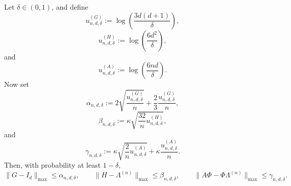 \begin{corollary}
	\label{cor:results-simultaneous-control}
	Let \(\delta\in(0,1)\), and define
	\begin{equation}
		u_{n,d,\delta}^{(G)}
		:=
		\log\!\left(\frac{3d(d+1)}{\delta}\right),
		\label{eq:results-uG}
	\end{equation}
	\begin{equation}
		u_{n,d,\delta}^{(H)}
		:=
		\log\!\left(\frac{6d^2}{\delta}\right),
		\label{eq:results-uH}
	\end{equation}
	and
	\begin{equation}
		u_{n,d,\delta}^{(A)}
		:=
		\log\!\left(\frac{6nd}{\delta}\right).
		\label{eq:results-uA}
	\end{equation}
	Now set
	\begin{equation}
		\alpha_{n,d,\delta}
		:=
		2\sqrt{\frac{u_{n,d,\delta}^{(G)}}{n}}
		+\frac{2}{3}\frac{u_{n,d,\delta}^{(G)}}{n},
		\label{eq:results-alpha}
	\end{equation}
	\begin{equation}
		\beta_{n,d,\delta}
		:=
		\kappa\sqrt{\frac{32}{n}u_{n,d,\delta}^{(H)}},
		\label{eq:results-beta}
	\end{equation}
	and
	\begin{equation}
		\gamma_{n,d,\delta}
		:=
		\kappa\sqrt{\frac{2}{n}u_{n,d,\delta}^{(A)}}
		+\kappa\frac{u_{n,d,\delta}^{(A)}}{n}.
		\label{eq:results-gamma}
	\end{equation}
	Then, with probability at least \(1-\delta\),
	\begin{equation}
		\|G-I_d\|_{\max}\le \alpha_{n,d,\delta},
		\qquad
		\|H-\Lambda^{(n)}\|_{\max}\le \beta_{n,d,\delta},
		\qquad
		\|A\Phi-\Phi\Lambda^{(n)}\|_{\max}\le \gamma_{n,d,\delta}.
		\label{eq:results-simultaneous-bounds}
	\end{equation}
\end{corollary}

